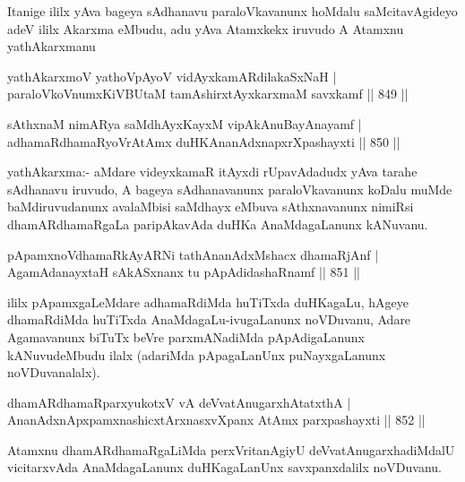 \begin{artha}
Itanige ililx yAva bageya sAdhanavu paraloVkavanunx hoMdalu saMcitavAgideyo adeV ililx Akarxma eMbudu, adu yAva Atamxkekx iruvudo A Atamxnu yathA\s \s karxmanu
\end{artha}

\begin{shl}
yathAkarxmoV yathoVpAyoV vidAyxkamARdilakaSxNaH | \\
paraloVkoVnumxKiVBUtaM tamAshirxtAyx\s \s karxmaM savxkamf \hfill||  849 ||  
\end{shl}
				
\begin{shl}
sAthxnaM nimARya saMdhAyxKayxM vipAkAnuBayAnayamf | \\
adhamaRdhamaRyoVrAtAmx duHKAnanAdxnapxrXpashayxti \hfill||  850 ||  
\end{shl}

\begin{artha}
yathAkarxma:- aMdare videyxkamaR itAyxdi rUpavAdadudx yAva tarahe sAdhanavu iruvudo, A bageya sAdhanavanunx paraloVkavanunx koDalu muMde baMdiruvudanunx avalaMbisi saMdhayx eMbuva sAthxnavanunx nimiRsi dhamARdhamaRgaLa paripAkavAda duHKa AnaMdagaLanunx kANuvanu.
\end{artha}


\begin{shl}
pApamxnoV\s dhamaRkAyARNi tathA\s \s nanAdxMshacx dhamaRjAnf | \\
AgamAdanayxtaH sAkASxnanx tu pApAdidashaRnamf \hfill||  851 ||  
\end{shl}

\begin{artha}
ililx pApamxgaLeMdare adhamaRdiMda huTiTxda duHKagaLu, hAgeye dhamaRdiMda huTiTxda AnaMdagaLu-ivugaLanunx noVDuvanu, Adare Agamavanunx biTuTx beVre parxmANadiMda pApAdigaLanunx kANuvudeMbudu ilalx (adariMda pApagaLanUnx puNayxgaLanunx noVDuvanalalx).
\end{artha}


\begin{shl}
dhamARdhamaRparxyukotxV vA deVvatAnugarxhAtatxthA | \\
AnanAdxnApxpamxnashicxtArxnasxvXpanx AtAmx parxpashayxti \hfill||  852 ||  
\end{shl}

\begin{artha}
Atamxnu dhamARdhamaRgaLiMda perxVritanAgiyU deVvatAnugarxhadiMdalU vicitarxvAda AnaMdagaLanunx duHKagaLanUnx savxpanxdalilx noVDuvanu.
\end{artha}

